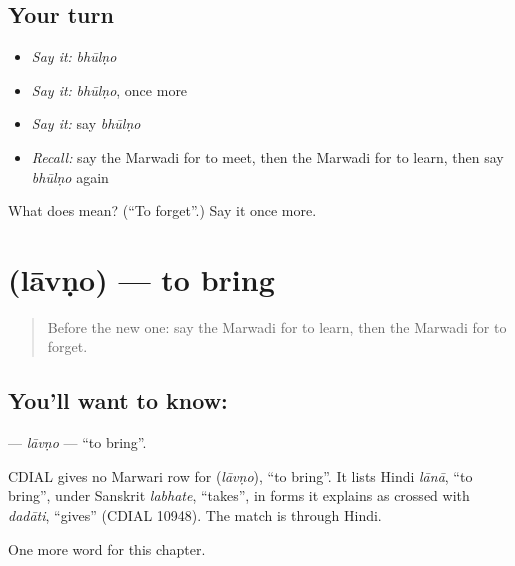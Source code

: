\subsection*{Your turn}
\begin{itemize}
\raggedright
  \item \emph{Say it:} \emph{bhūlṇo}
  \item \emph{Say it:} \emph{bhūlṇo}, once more
  \item \emph{Say it:} say \emph{bhūlṇo}
  \item \emph{Recall:} say the Marwadi for to meet, then the Marwadi for to learn, then say \emph{bhūlṇo} again
\end{itemize}

\begin{tcolorbox}[breakable,colback=teal!4,colframe=teal!35!black,title={Before you move on}]
What does  mean? (\textquotedblleft{}To forget\textquotedblright{}.) Say it once more.
\end{tcolorbox}
\section[\texorpdfstring{\mw{लावणो} (lāvṇo)}{लावणो (lāvṇo)}]{ (lāvṇo) — to bring}

\label{lesson:MW-C55-lavno}



\begin{quote}
Before the new one: say the Marwadi for to learn, then the Marwadi for to forget.
\end{quote}

\subsection*{You'll want to know: }
\textbf{} — \emph{lāvṇo} — \textquotedblleft{}to bring\textquotedblright{}.

\begin{cousinweb}
CDIAL gives no Marwari row for \textbf{} (\emph{lāvṇo}), \textquotedblleft{}to bring\textquotedblright{}. It lists Hindi \emph{lānā}, \textquotedblleft{}to bring\textquotedblright{}, under Sanskrit \emph{labhate}, \textquotedblleft{}takes\textquotedblright{}, in forms it explains as crossed with \emph{dadāti}, \textquotedblleft{}gives\textquotedblright{} (CDIAL 10948). The match is through Hindi.
\end{cousinweb}

\begin{grammarlens}[title={What you've built}]
One more word for this chapter.
\end{grammarlens}

